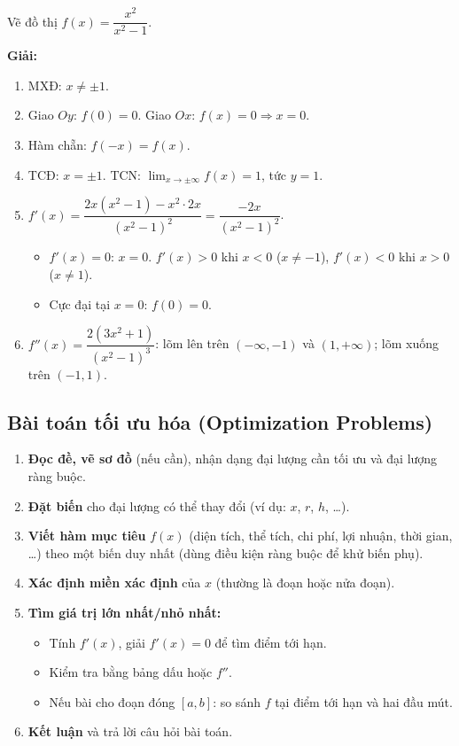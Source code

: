 \documentclass[12pt,a4paper]{article}
\begin{document}
\begin{vidu}
  Vẽ đồ thị $f(x) = \dfrac{x^2}{x^2 - 1}$.

  \medskip\textbf{Giải:}
  \begin{enumerate}
    \item MXĐ: $x \ne \pm 1$.
    \item Giao $Oy$: $f(0) = 0$. Giao $Ox$: $f(x) = 0 \Rightarrow x = 0$.
    \item Hàm chẵn: $f(-x) = f(x)$.
    \item TCĐ: $x = \pm 1$. TCN: $\lim_{x\to\pm\infty} f(x) = 1$, tức $y = 1$.
    \item $f'(x) = \dfrac{2x(x^2-1) - x^2 \cdot 2x}{(x^2-1)^2} = \dfrac{-2x}{(x^2-1)^2}$.
      \begin{itemize}
        \item $f'(x) = 0$: $x = 0$. $f'(x) > 0$ khi $x < 0$ ($x \ne -1$), $f'(x) < 0$ khi $x > 0$ ($x \ne 1$).
        \item Cực đại tại $x = 0$: $f(0) = 0$.
      \end{itemize}
    \item $f''(x) = \dfrac{2(3x^2+1)}{(x^2-1)^3}$: lõm lên trên $(-\infty,-1)$ và $(1,+\infty)$; lõm xuống trên $(-1,1)$.
  \end{enumerate}
\end{vidu}

\subsection{Bài toán tối ưu hóa (Optimization Problems)}

\begin{phuongphap}[title={Quy trình giải bài toán tối ưu hóa}]
  \begin{enumerate}
    \item \textbf{Đọc đề, vẽ sơ đồ} (nếu cần), nhận dạng đại lượng cần tối ưu và đại lượng ràng buộc.
    \item \textbf{Đặt biến} cho đại lượng có thể thay đổi (ví dụ: $x$, $r$, $h$, \ldots).
    \item \textbf{Viết hàm mục tiêu} $f(x)$ (diện tích, thể tích, chi phí, lợi nhuận, thời gian, \ldots) theo một biến duy nhất (dùng điều kiện ràng buộc để khử biến phụ).
    \item \textbf{Xác định miền xác định} của $x$ (thường là đoạn hoặc nửa đoạn).
    \item \textbf{Tìm giá trị lớn nhất/nhỏ nhất:}
      \begin{itemize}
        \item Tính $f'(x)$, giải $f'(x) = 0$ để tìm điểm tới hạn.
        \item Kiểm tra bằng bảng dấu hoặc $f''$.
        \item Nếu bài cho đoạn đóng $[a,b]$: so sánh $f$ tại điểm tới hạn và hai đầu mút.
      \end{itemize}
    \item \textbf{Kết luận} và trả lời câu hỏi bài toán.
  \end{enumerate}
\end{phuongphap}
\end{document}
